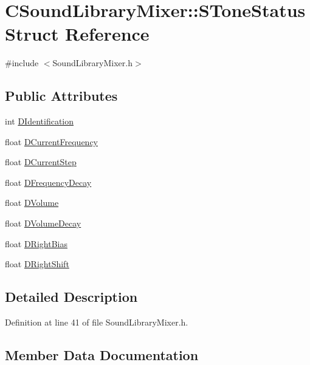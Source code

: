 \hypertarget{structCSoundLibraryMixer_1_1SToneStatus}{}\section{C\+Sound\+Library\+Mixer\+:\+:S\+Tone\+Status Struct Reference}
\label{structCSoundLibraryMixer_1_1SToneStatus}


{\ttfamily \#include $<$Sound\+Library\+Mixer.\+h$>$}

\subsection*{Public Attributes}
\begin{DoxyCompactItemize}
\item 
int \hyperlink{structCSoundLibraryMixer_1_1SToneStatus_a4573954af1301756c08e09951bb5446d}{D\+Identification}
\item 
float \hyperlink{structCSoundLibraryMixer_1_1SToneStatus_ac8c68dc4b018dc6055a0398db188f0d0}{D\+Current\+Frequency}
\item 
float \hyperlink{structCSoundLibraryMixer_1_1SToneStatus_a4ad3b9cbb161945d34d2aa6f2bcf7ef4}{D\+Current\+Step}
\item 
float \hyperlink{structCSoundLibraryMixer_1_1SToneStatus_af7965b72940ecf75158c86bd08743223}{D\+Frequency\+Decay}
\item 
float \hyperlink{structCSoundLibraryMixer_1_1SToneStatus_a95cb65bb95165b6ebaf236820ceefbc9}{D\+Volume}
\item 
float \hyperlink{structCSoundLibraryMixer_1_1SToneStatus_aa4b4dcadb27364e176769e4f0b15a6c9}{D\+Volume\+Decay}
\item 
float \hyperlink{structCSoundLibraryMixer_1_1SToneStatus_abb913d4ba795bfd4f1734138bc15018d}{D\+Right\+Bias}
\item 
float \hyperlink{structCSoundLibraryMixer_1_1SToneStatus_ae7b7cfd4de145fc06d5a6e93e8ef75d3}{D\+Right\+Shift}
\end{DoxyCompactItemize}


\subsection{Detailed Description}


Definition at line 41 of file Sound\+Library\+Mixer.\+h.



\subsection{Member Data Documentation}
\hypertarget{structCSoundLibraryMixer_1_1SToneStatus_ac8c68dc4b018dc6055a0398db188f0d0}{}\label{structCSoundLibraryMixer_1_1SToneStatus_ac8c68dc4b018dc6055a0398db188f0d0} 
